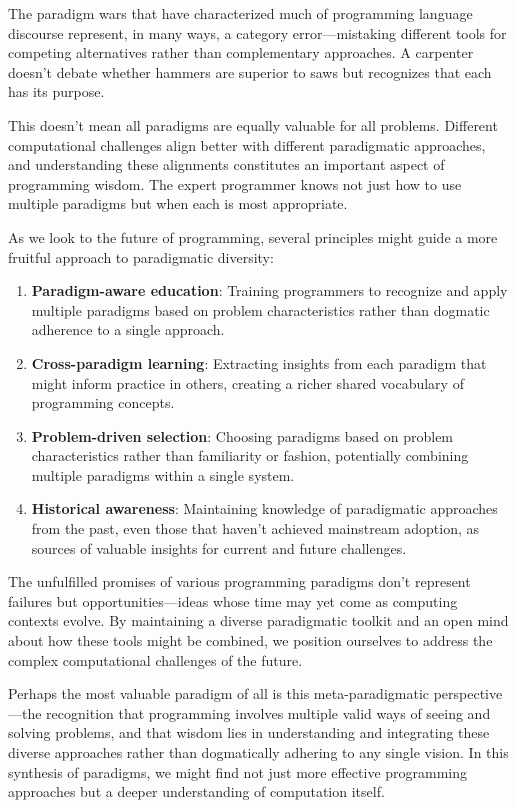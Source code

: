 \documentclass[11pt]{article}
\begin{document}
The paradigm wars that have characterized much of programming language discourse represent, in many ways, a category error—mistaking different tools for competing alternatives rather than complementary approaches. A carpenter doesn't debate whether hammers are superior to saws but recognizes that each has its purpose.

This doesn't mean all paradigms are equally valuable for all problems. Different computational challenges align better with different paradigmatic approaches, and understanding these alignments constitutes an important aspect of programming wisdom. The expert programmer knows not just how to use multiple paradigms but when each is most appropriate.

As we look to the future of programming, several principles might guide a more fruitful approach to paradigmatic diversity:

\begin{enumerate}
\item \textbf{Paradigm-aware education}: Training programmers to recognize and apply multiple paradigms based on problem characteristics rather than dogmatic adherence to a single approach.

\item \textbf{Cross-paradigm learning}: Extracting insights from each paradigm that might inform practice in others, creating a richer shared vocabulary of programming concepts.

\item \textbf{Problem-driven selection}: Choosing paradigms based on problem characteristics rather than familiarity or fashion, potentially combining multiple paradigms within a single system.

\item \textbf{Historical awareness}: Maintaining knowledge of paradigmatic approaches from the past, even those that haven't achieved mainstream adoption, as sources of valuable insights for current and future challenges.
\end{enumerate}

The unfulfilled promises of various programming paradigms don't represent failures but opportunities—ideas whose time may yet come as computing contexts evolve. By maintaining a diverse paradigmatic toolkit and an open mind about how these tools might be combined, we position ourselves to address the complex computational challenges of the future.

Perhaps the most valuable paradigm of all is this meta-paradigmatic perspective—the recognition that programming involves multiple valid ways of seeing and solving problems, and that wisdom lies in understanding and integrating these diverse approaches rather than dogmatically adhering to any single vision. In this synthesis of paradigms, we might find not just more effective programming approaches but a deeper understanding of computation itself.
\end{document}
